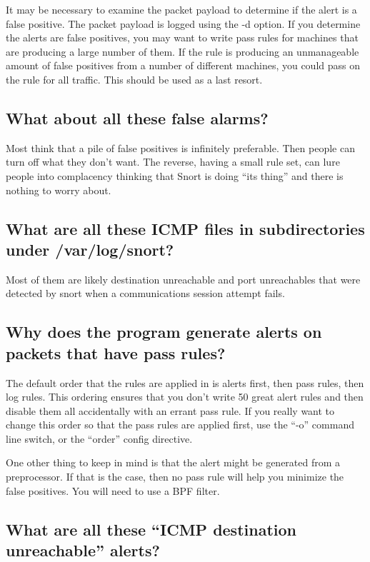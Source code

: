 \documentclass{article}
\begin{document}
It may be necessary to examine the packet payload to determine if the
alert is a false positive.  The packet payload is logged using the -d
option.  If you determine the alerts are false positives, you may want
to write pass rules for machines that are producing a large number of them.
If the rule is producing an unmanageable amount of false positives from
a number of different machines, you could pass on the rule for all traffic.
This should be used as a last resort.

\subsection{What about all these false alarms? }

Most think that a pile of false positives is infinitely preferable. Then
people can turn off what they don't want. The reverse, having a small rule
set, can lure people into complacency thinking that Snort is doing ``its
thing'' and there is nothing to worry about.
 

\subsection{What are all these ICMP files in subdirectories under /var/log/snort? }

Most of them are likely destination unreachable and port unreachables that
were detected by snort when a communications session attempt fails.


\subsection{Why does the program generate alerts on packets that have pass rules?  }

The default order that the rules are applied in is alerts first, then pass
rules, then log rules. This ordering ensures that you don't write 50 great
alert rules and then disable them all accidentally with an errant pass rule. If
you really want to change this order so that the pass rules are applied first,
use the ``-o'' command line switch, or the ``order'' config directive.

One other thing to keep in mind is that the alert might be generated from a
preprocessor. If that is the case, then no pass rule will help you minimize the
false positives. You will need to use a BPF filter. 

\subsection{What are all these ``ICMP destination unreachable'' alerts? }
\end{document}
